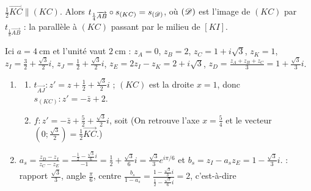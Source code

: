 \begin{corrige}
\begin{sol}
\begin{description}
\begin{enumerate}
\begin{enumerate}
                              $\frac12\overrightarrow{KC} \parallel (KC)$. Alors $t_{\frac14\overrightarrow{AB}} \circ s_{(KC)} = s_{(\mathscr{D})}$, où $(\mathscr{D})$ est l'image de $(KC)$
                              par $t_{\frac18\overrightarrow{AB}}$ : la parallèle à $(KC)$ passant par le milieu de $[KI]$.
            \end{enumerate}
      \end{enumerate}
      \item[III.] Ici $a = 4~\mathrm{cm}$ et l'unité vaut $2~\mathrm{cm}$ : $z_A = 0$, $z_B = 2$, $z_C = 1 + i\sqrt3$, $z_K = 1$,
            $z_I = \frac32 + \frac{\sqrt3}{2}i$, $z_J = \frac12 + \frac{\sqrt3}{2}i$, $z_E = 2z_I - z_K = 2 + i\sqrt3$, $z_D = \frac{z_A + z_B + z_C}{3} = 1 + \frac{\sqrt3}{3}i$.
      \begin{enumerate}
            \item \begin{enumerate}
                        \item $t_{\overrightarrow{AJ}} : z' = z + \frac12 + \frac{\sqrt3}{2}i$ ; $(KC)$ est la droite $x = 1$, donc $s_{(KC)} : z' = -\bar{z} + 2$.
                        \item $f : z' = -\bar{z} + \frac52 + \frac{\sqrt3}{2}i$, soit 
                              (On retrouve l'axe $x = \frac54$ et le vecteur $\left(0;\frac{\sqrt3}{2}\right) = \frac12\overrightarrow{KC}$.)
                  \end{enumerate}
            \item $a_s = \frac{z_D - z_I}{z_C - z_E} = \frac{-\frac12 - \frac{\sqrt3}{6}i}{-1} = \frac12 + \frac{\sqrt3}{6}i = \frac{\sqrt3}{3}e^{i\pi/6}$ et
                  $b_s = z_I - a_s z_E = 1 - \frac{\sqrt3}{3}i$.
                   :
                  rapport $\frac{\sqrt3}{3}$, angle $\frac{\pi}{6}$, centre $\frac{b_s}{1 - a_s} = \frac{1 - \frac{\sqrt3}{3}i}{\frac12 - \frac{\sqrt3}{6}i} = 2$, c'est-à-dire 
      \end{enumerate}
\end{description}
\end{sol}
\begin{sol}

\end{sol}
\end{corrige}
